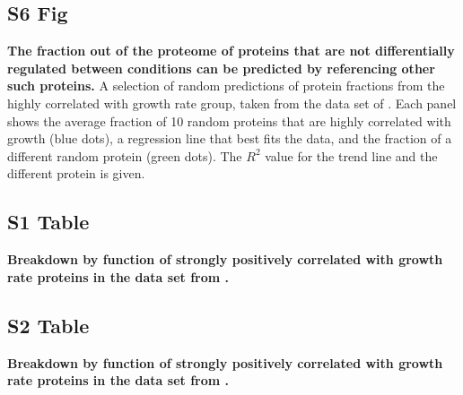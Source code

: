 \documentclass[10pt,letterpaper]{article}
\begin{document}
\subsection*{S6 Fig}
\label{fig:randpred}
    {\bf The fraction out of the proteome of proteins that are not differentially regulated between conditions can be predicted by referencing other such proteins.}
  A selection of random predictions of protein fractions from the highly correlated with growth rate group, taken from the data set of \cite{Schmidt2015}.
  Each panel shows the average fraction of 10 random proteins that are highly correlated with growth (blue dots), a regression line that best fits the data, and the fraction of a different random protein (green dots).
  The $R^2$ value for the trend line and the different protein is given.
%

\subsection*{S1 Table}
\bf Breakdown by function of strongly positively correlated with growth rate proteins in the data set from \cite{Schmidt2015}.
\label{tab:corrbreakdownh}

\subsection*{S2 Table}
\bf Breakdown by function of strongly positively correlated with growth rate proteins in the data set from \cite{Peebo_2015}.
\label{tab:corrbreakdownv}
\end{document}

